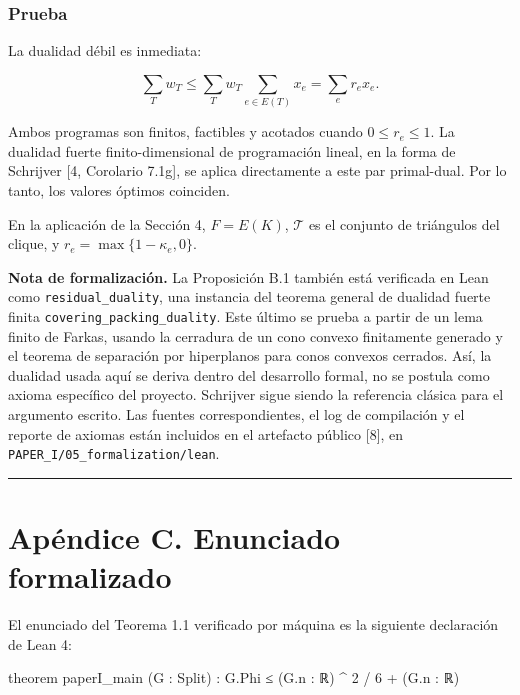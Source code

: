 \documentclass[
  11pt,
]{article}
\newenvironment{Shaded}{}{}
\newcommand{\NormalTok}[1]{#1}
\begin{document}
\subsubsection{Prueba}\label{prueba-2}

La dualidad débil es inmediata:

\[
\sum_Tw_T
\le
\sum_Tw_T\sum_{e\in E(T)}x_e
=
\sum_er_e x_e.
\]

Ambos programas son finitos, factibles y acotados cuando
\(0\le r_e\le1\). La dualidad fuerte finito-dimensional de programación
lineal, en la forma de Schrijver {[}4, Corolario 7.1g{]}, se aplica
directamente a este par primal-dual. Por lo tanto, los valores óptimos
coinciden.

En la aplicación de la Sección 4, \(F=E(K)\), \(\mathcal T\) es el
conjunto de triángulos del clique, y \(r_e=\max\{1-\kappa_e,0\}\).

\textbf{Nota de formalización.} La Proposición B.1 también está
verificada en Lean como \texttt{residual\_duality}, una instancia del
teorema general de dualidad fuerte finita
\texttt{covering\_packing\_duality}. Este último se prueba a partir de
un lema finito de Farkas, usando la cerradura de un cono convexo
finitamente generado y el teorema de separación por hiperplanos para
conos convexos cerrados. Así, la dualidad usada aquí se deriva dentro
del desarrollo formal, no se postula como axioma específico del
proyecto. Schrijver sigue siendo la referencia clásica para el argumento
escrito. Las fuentes correspondientes, el log de compilación y el
reporte de axiomas están incluidos en el artefacto público {[}8{]}, en
\texttt{PAPER\_I/05\_formalization/lean}.

\begin{center}\rule{0.5\linewidth}{0.5pt}\end{center}

\section{Apéndice C. Enunciado
formalizado}\label{apuxe9ndice-c.-enunciado-formalizado}

El enunciado del Teorema 1.1 verificado por máquina es la siguiente
declaración de Lean 4:

\begin{Shaded}
\begin{Highlighting}[]
\NormalTok{theorem paperI\_main (G : Split) :}
\NormalTok{    G.Phi ≤ (G.n : ℝ) \^{} 2 / 6 + (G.n : ℝ)}
\end{Highlighting}
\end{Shaded}
\end{document}
